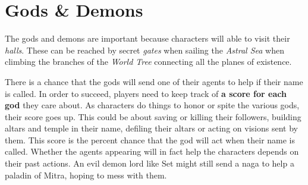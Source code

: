 \documentclass[a4paper,serif]{rpg-module}
\begin{document}

\part{Gods \& Demons}

The gods and demons are important because characters will able to
visit their \emph{halls}. These can be reached by secret \emph{gates}
when sailing the \emph{Astral Sea} when climbing the branches of the
\emph{World Tree} connecting all the planes of existence.

There is a chance that the gods will send one of their agents to help
if their name is called. In order to succeed, players need to keep
track of \textbf{a score for each god} they care about. As characters
do things to honor or spite the various gods, their score goes up.
This could be about saving or killing their followers, building altars
and temple in their name, defiling their altars or acting on visions
sent by them. This score is the percent chance that the god will act
when their name is called. Whether the agents appearing will in fact
help the characters depends on their past actions. An evil demon lord
like Set might still send a naga to help a paladin of Mitra, hoping to
mess with them.
\end{document}
